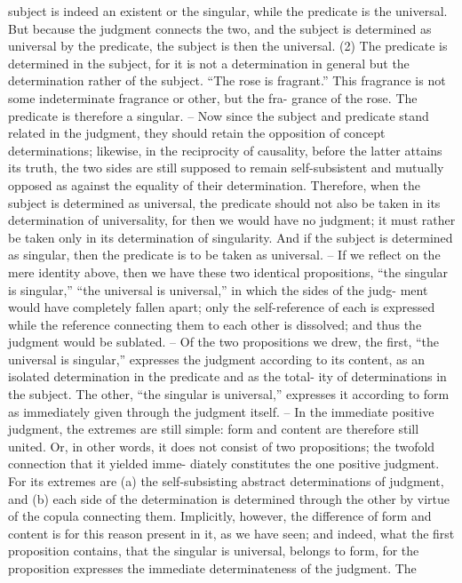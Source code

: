 subject is indeed an existent or the singular, while the predicate is the
universal. But because the judgment connects the two, and the subject is
determined as universal by the predicate, the subject is then the universal.
(2) The predicate is determined in the subject, for it is not a determination
in general but the determination rather of the subject. “The rose is fragrant.”
This fragrance is not some indeterminate fragrance or other, but the fra-
grance of the rose. The predicate is therefore a singular. – Now since the
subject and predicate stand related in the judgment, they should retain
the opposition of concept determinations; likewise, in the reciprocity of
causality, before the latter attains its truth, the two sides are still supposed
to remain self-subsistent and mutually opposed as against the equality of
their determination. Therefore, when the subject is determined as universal,
the predicate should not also be taken in its determination of universality,
for then we would have no judgment; it must rather be taken only in its
determination of singularity. And if the subject is determined as singular,
then the predicate is to be taken as universal. – If we reflect on the mere
identity above, then we have these two identical propositions, “the singular
is singular,” “the universal is universal,” in which the sides of the judg-
ment would have completely fallen apart; only the self-reference of each is
expressed while the reference connecting them to each other is dissolved;
and thus the judgment would be sublated. – Of the two propositions we
drew, the first, “the universal is singular,” expresses the judgment according
to its content, as an isolated determination in the predicate and as the total-
ity of determinations in the subject. The other, “the singular is universal,”
expresses it according to form as immediately given through the judgment
itself. – In the immediate positive judgment, the extremes are still simple:
form and content are therefore still united. Or, in other words, it does not
consist of two propositions; the twofold connection that it yielded imme-
diately constitutes the one positive judgment. For its extremes are (a) the
self-subsisting abstract determinations of judgment, and (b) each side of
the determination is determined through the other by virtue of the copula
connecting them. Implicitly, however, the difference of form and content
is for this reason present in it, as we have seen; and indeed, what the first
proposition contains, that the singular is universal, belongs to form, for the
proposition expresses the immediate determinateness of the judgment. The
